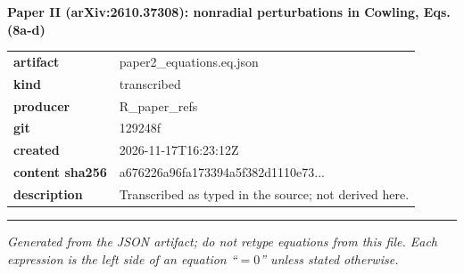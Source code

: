 \documentclass[10pt,a4paper]{article}
\begin{document}
{\Large\bfseries Paper II (arXiv:2610.37308): nonradial perturbations in Cowling, Eqs. (8a-d)}\par
\smallskip
\begin{tabular}{@{}lp{}@{}}\textbf{artifact} & paper2\_equations.eq.json\\\textbf{kind} & transcribed\\\textbf{producer} & R\_paper\_refs\\\textbf{git} & 129248f\\\textbf{created} & 2026-11-17T16:23:12Z\\\textbf{content sha256} & a676226a96fa173394a5f382d1110e73...\\\textbf{description} & Transcribed as typed in the source; not derived here.\\\end{tabular}
\par\medskip\hrule\medskip

\textit{Generated from the JSON artifact; do not retype equations from this file. Each expression is the left side of an equation ``$= 0$'' unless stated otherwise.}\par
\end{document}
